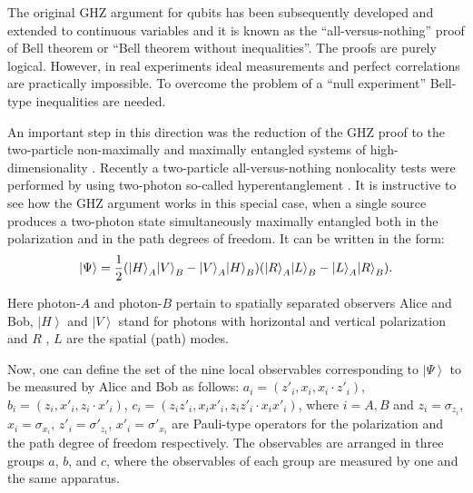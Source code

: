 \documentclass[rmp,12pt,preprint]{revtex4-2}
\begin{document}
The original GHZ argument for qubits has been subsequently developed
\cite {Mermin,CerfMP,Hardy93,Cabello1,Cabello2,ChenPZBZ2003,GHZ1,GHZ2}
and extended to continuous variables \cite {Clifton,MassarP,ChenZ} and
it is known as the ``all-versus-nothing'' proof of Bell theorem or
``Bell theorem without inequalities''. The proofs are purely logical.
However, in real experiments ideal measurements and perfect
correlations are practically impossible. To overcome the problem of a
``null experiment'' Bell-type inequalities are needed.

An important step in this direction was the reduction of the GHZ proof
to the two-particle non-maximally \cite {Hardy93} and maximally
entangled systems of high-dimensionality \cite
{Pan,Kaszlikowski,Durt,Chen2,Mandel}. Recently a two-particle
all-versus-nothing nonlocality tests were performed by using
two-photon so-called hyperentanglement \cite {Zukowski,Martini}. It is
instructive to see how the GHZ argument works in this special case,
when a single source produces a two-photon state simultaneously
maximally entangled both in the polarization and in the path degrees
of freedom. It can be written in the form:
\begin{equation}
\left|\Psi\right\rangle = {1\over 2}({\left|H\right\rangle_A}{\left|V\right\rangle_B}-{\left|V\right\rangle_A}{\left|H\right\rangle_B})({\left|R\right\rangle_A}{\left|L\right\rangle_B}-{\left|L\right\rangle_A}{\left|R\right\rangle_B}).
\label{psi}
\end{equation}

Here photon-$A$ and photon-$B$ pertain to spatially separated
observers Alice and Bob, $\left|H\right\rangle$ and
$\left|V\right\rangle$ stand for photons with horizontal and
vertical polarization and $R$ , $L$ are the spatial (path) modes.

Now, one can define the set of the nine local observables
corresponding to $\left|\Psi\right\rangle$ to be measured by Alice
and Bob as follows: $a_i = ({{z'_i}},{x_i},{x_i}\cdot{z'_i})$, $b_i
= (z_i,x'_i,z_i\cdot{x'_i})$,  $c_i =(z_iz'_i,x_ix'_i,z_iz'_i
\cdot{x_ix'_i})$, where $i=A,B$ and $z_i = \sigma_{z_i}$, $x_i =
\sigma_{x_i}$, $z'_i = \sigma'_{z_i}$, $x'_i = \sigma'_{x_i}$ are
Pauli-type operators for the polarization and the path degree of
freedom respectively. The observables are arranged in three groups
$a$, $b$, and $c$, where the observables of each group are measured
by one and the same apparatus.
\end{document}
